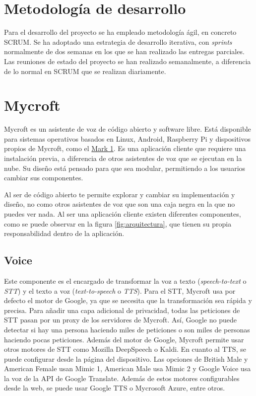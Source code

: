 \section{Metodología de desarrollo}

Para el desarrollo del proyecto se ha empleado metodología ágil, en concreto SCRUM. Se ha adoptado una estrategia de desarrollo iterativa, con \textit{sprints} normalmente de dos semanas en los que se han realizado las entregas parciales. Las reuniones de estado del proyecto se han realizado semanalmente, a diferencia de lo normal en SCRUM que se realizan diariamente.

\section{Mycroft}

Mycroft\cite{MycroftSoftware2019} es un asistente de voz de código abierto y software libre. Está disponible para sistemas operativos basados en Linux, Android, Raspberry Pi y dispositivos propios de Mycroft, como el \href{https://mycroft.ai/product/mycroft-mark-1/}{Mark 1}. Es una aplicación cliente que requiere una instalación previa, a diferencia de otros asistentes de voz que se ejecutan en la nube. Su diseño está pensado para que sea modular, permitiendo a los usuarios cambiar sus componentes.

Al ser de código abierto te permite explorar y cambiar su implementación y diseño, no como otros asistentes de voz que son una caja negra en la que no puedes ver nada. Al ser una aplicación cliente existen diferentes componentes, como se puede observar en la figura \ref{fig:arquitectura}, que tienen su propia responsabilidad dentro de la aplicación.

\subsection{Voice\cite{TechnologyOverview}}

Este componente es el encargado de transformar la voz a texto (\textit{speech-to-text} o \textit{STT}) y el texto a voz (\textit{text-to-speech} o \textit{TTS}).
Para el STT, Mycroft usa por defecto el motor de Google, ya que se necesita que la transformación sea rápida y precisa. Para añadir una capa adicional de privacidad, todas las peticiones de STT pasan por un proxy de los servidores de Mycroft. Así, Google no puede detectar si hay una persona haciendo miles de peticiones o son miles de personas haciendo pocas peticiones. Además del motor de Google, Mycroft permite usar otros motores de STT como Mozilla DeepSpeech o Kaldi.
En cuanto al TTS, se puede configurar desde la página del dispositivo. Las opciones de British Male y American Female usan Mimic 1, American Male usa Mimic 2 y Google Voice usa la voz de la API de Google Translate. Además de estos motores configurables desde la web, se puede usar Google TTS o Mycrosoft Azure, entre otros.

